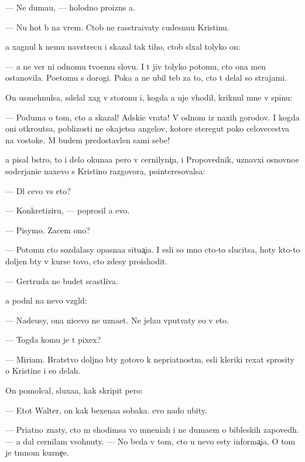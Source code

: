 \documentclass[10pt]{book}
\begin{document}
— Ne duma{\y}u, — holodno proizn{\e}s {\y}a.

— Nu hot{\ia} b{\yi} na vrem{\ia}. Ctob{\yi} ne rasstra{\y}ivaty cudesnu{\y}u Kristinu.

{\Y}a xagnul k nemu navstrecu i skazal tak tiho, ctob{\yi} sl{\yi}xal tolyko on:

— {\Y}a ne ver{\io} ni odnomu tvo{\y}emu slovu. I t{\yi} jiv tolyko potomu, cto ona men{\ia} ostanovila. Poetomu s dorogi. Poka {\y}a ne ubil teb{\ia} za to, cto t{\yi} delal so strajami.

On usmehnulsa, sdelal xag v storonu i, kogda {\y}a uje v{\yi}hodil, kriknul mne v spinu:

— Poduma{\y} o tom, cto {\y}a skazal! Adski{\y}e vra\-ta! V odnom iz naxih gorodov. I kogda oni otkro{\y}utsa, poblizosti ne okajetsa angelov, ko\-to\-r{\yi}\-{\y}e steregut poko{\y} celovecestva na vostoke. M{\yi} budem predostavlen{\yi} sami sebe!



{\Y}a pisal b{\yi}stro, to i delo okuna{\y}a pero v cernilyni{\c}u, i Pro\-po\-ved\-nik, uznavxi{\y} osnovno{\y}e soderjani{\y}e naxevo s Kristino{\y} razgovora, pointeresovalsa:

— Dl{\ia} cevo vs{\e} eto?

— Konkretiziru{\y}, — poprosil {\y}a {\y}evo.

— Pisymo. Zacem ono?

— Potomu cto sozdalasy opasna{\y}a situa{\c}i{\y}a. I {\y}esli so mno{\y} cto-to slucitsa, hoty kto-to doljen b{\yi}ty v kurse tovo, cto zdesy proishodit.

— Gertruda ne budet scastliva.

{\Y}a podn{\ia}l na nevo vzgl{\ia}d:

— Nade{\y}usy, ona nicevo ne uzna{\y}et. Ne jela{\y}u vput{\yi}vaty {\y}e{\y}o v eto.

— Togda komu je t{\yi} pixex?

— Mi\-ri\-am. Bratstvo doljno b{\yi}ty gotovo k nepri{\y}atnost{\ia}m, {\y}esli kleriki rexat sprosity o Kristine i {\y}e{\y}o delah.

On pomolcal, sluxa{\y}a, kak skripit pero:

— Etot Walter, on kak bexena{\y}a sobaka. {\Y}evo nado ubity.

— Pri{\y}atno znaty, cto m{\yi} shodimsa vo mneni{\y}ah i ne duma{\y}em o bible{\y}skih zapoved{\ia}h. — {\Y}a dal cernilam v{\yi}sohnuty. — No beda v tom, cto u nevo {\y}esty informa{\c}i{\y}a. O tom je t{\e}mnom kuzne{\c}e.
\end{document}
